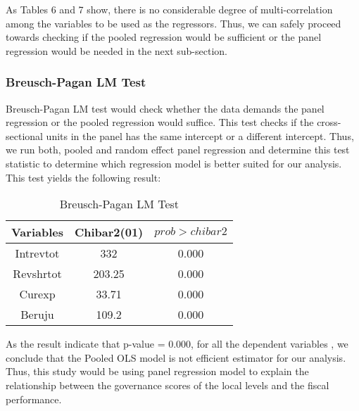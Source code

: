 As Tables 6 and 7 show, there is no considerable degree of multi-correlation among the variables to be used as the regressors. Thus, we can safely proceed towards checking if the pooled regression would be sufficient or the panel regression would be needed in the next sub-section.\par
\subsubsection{Breusch-Pagan LM Test}
Breusch-Pagan LM test would check whether the data demands the panel regression  or the pooled regression would suffice. This test checks if the cross-sectional units in the panel has the same intercept or a different intercept. Thus, we run both, pooled and random effect panel regression and determine this test statistic to determine which regression model is better suited for our analysis. This test yields the following result:\par
\begin{table}[H]
  \centering
   \begin{tabular}{c|cc}
     Variables &Chibar2(01) & \(prob>chibar2\) \\
        \hline
    Intrevtot & 332 &0.000\\
    Revshrtot & 203.25 &0.000 \\
    Curexp & 33.71 & 0.000\\
    Beruju & 109.2 & 0.000 \\
    \hline
    \end{tabular}
    \caption{Breusch-Pagan LM Test }  
     \label{Breusch-Pagan LM Test }
\end{table} 
As the result indicate that p-value = 0.000, for all the dependent variables , we conclude that the Pooled OLS model is not efficient estimator for our analysis. Thus, this study would be using panel regression model to explain the relationship between the governance scores of the local levels and the fiscal performance.
